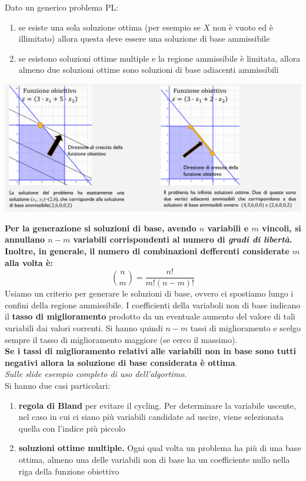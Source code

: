 \message{ !name(ro.tex)}\documentclass[a4paper,12pt, oneside]{book}
\begin{document}
\begin{teorema}
  Dato un generico problema PL:
  \begin{enumerate}
    \item se esiste una sola soluzione ottima (per esempio se $X$ non
    è vuoto ed è illimitato) allora questa deve essere una soluzione
    di base ammissibile
    \item se esistono soluzioni ottime multiple e la regione
    ammissibile è limitata, allora almeno due soluzioni ottime sono
    soluzioni di base adiacenti ammissibili
  \end{enumerate}
  \begin{center}
    \includegraphics[scale = 1]{img/simp23.png}
  \end{center}
\end{teorema}
\textbf{Per la generazione si soluzioni di base, avendo $n$ variabili e $m$
  vincoli, si annullano $n-m$ variabili corrispondenti al numero di
  \textit{gradi di libertà}. Inoltre, in generale, il numero di
  combinazioni defferenti considerate $m$ alla volta è:}
\[{n\choose m}=\frac{n!}{m!(n-m)!}\]
Usiamo un criterio per generare le soluzioni di base, ovvero ci
spostiamo lungo i confini della regione ammissibile. I coefficienti della
variaboli non di base indicano il \textbf{tasso di miglioramento}
prodotto da un eventuale aumento del valore di
tali variabili dai valori correnti. Si hanno quindi $n-m$ tassi di
miglioramento e scelgo sempre il tasso di miglioramento maggiore (se
cerco il massimo).\\
\textbf{Se i tassi di miglioramento relativi alle variabili non in
  base sono tutti negativi allora la soluzione di base considerata
  è ottima}.\\
\textit{Sulle slide esempio completo di uso dell'algortimo.}\\
Si hanno due casi particolari:
\begin{enumerate}
  \item \textbf{regola di Bland} per evitare il cycling.
  Per determinare la variabile uscente, nel caso in cui ci siano
  più variabili candidate ad uscire, viene selezionata quella con
  l’indice più piccolo
  \item \textbf{soluzioni ottime multiple.} Ogni qual volta un
  problema ha più di una base ottima, almeno una delle variabili non
  di base ha un coefficiente nullo nella riga della funzione
  obiettivo
\end{enumerate}
\end{document}
